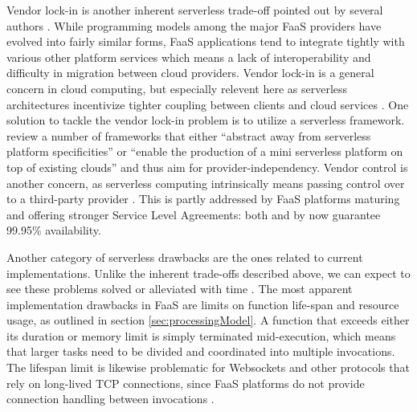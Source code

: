 Vendor lock-in is another inherent serverless trade-off pointed out by several authors \parencite[e.g.][]{baldini17currentTrends,cncf18serverlessWG,robert2016serverlessarchitectures}. While programming models among the major FaaS providers have evolved into fairly similar forms, FaaS applications tend to integrate tightly with various other platform services which means a lack of interoperability and difficulty in migration between cloud providers. Vendor lock-in is a general concern in cloud computing, but especially relevent here as serverless architectures incentivize tighter coupling between clients and cloud services \parencite{adzic2017serverless}. One solution to tackle the vendor lock-in problem is to utilize a serverless framework. \textcite{kritikos18frameworks} review a number of frameworks that either ``abstract away from serverless platform specificities'' or ``enable the production of a mini serverless platform on top of existing clouds'' and thus aim for provider-independency. Vendor control is another concern, as serverless computing intrinsically means passing control over to a third-party provider \parencite{robert2016serverlessarchitectures}. This is partly addressed by FaaS platforms maturing and offering stronger Service Level Agreements: both \textcite{awslambda0218} and \textcite{microsoft18azureFunctions} by now guarantee 99.95\% availability.

Another category of serverless drawbacks are the ones related to current implementations. Unlike the inherent trade-offs described above, we can expect to see these problems solved or alleviated with time \parencite{robert2016serverlessarchitectures}. The most apparent implementation drawbacks in FaaS are limits on function life-span and resource usage, as outlined in section \ref{sec:processingModel}. A function that exceeds either its duration or memory limit is simply terminated mid-execution, which means that larger tasks need to be divided and coordinated into multiple invocations. The lifespan limit is likewise problematic for Websockets and other protocols that rely on long-lived TCP connections, since FaaS platforms do not provide connection handling between invocations \parencite{hendrickson16openlambda}.


